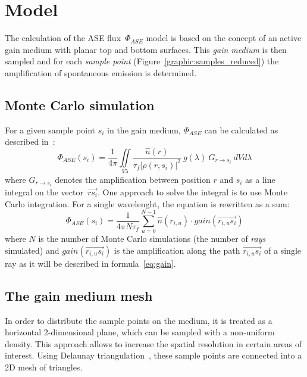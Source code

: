 \section{Model}
The calculation of the ASE flux~$\Phi_{ASE}$ model is based on the concept of an
active gain medium with planar top and bottom surfaces. This \emph{gain medium} is
then sampled and for each \emph{sample point} (Figure~\ref{graphic:samples_reduced}) the amplification of spontaneous emission is
determined. 

\subsection{Monte Carlo simulation}
\label{subsec:monteCarlo}
For a given sample point $s_i$ in the gain medium, $\Phi_{ASE}$ can
be calculated as described in~\cite{ASE2010}:
\begin{equation}
  \label{eq:phi_ase_daniel} 
  \Phi_{ASE}(s_i)=\frac{1}{4\pi}\iint\limits_{V \lambda}
  \frac
    {\hat{n}(r)}
    {\tau_{f}|\rho(r,s_i)|^2}
  ~g(\lambda)
  ~G_{r\rightarrow s_i}
  ~dV d\lambda
\end{equation}
where $G_{r\rightarrow s_i}$ denotes the amplification between
position $r$ and $s_i$ as a line integral on the vector~$\overrightarrow{rs_i}$.
One approach to solve the integral is to use Monte Carlo integration. For a
single wavelenght, the equation is rewritten as a sum:
\begin{equation}
  \label{eq:monte_carlo_ase}
  \Phi_{ASE}(s_i) = 
  \frac{1}{4\pi N\tau_f}
  \sum^{N-1}_{u=0} \hat{n}(r_{i,u}) \cdot gain(\overrightarrow{r_{i,u}s_i})
\end{equation}
where $N$ is the number of Monte Carlo simulations (the number of \emph{rays}
simulated) and $gain(\overrightarrow{r_{i,u}s_i})$ is the amplification along the
path $\overrightarrow{r_{i,u}s_i}$ of a single ray as it will be described in
formula~\eqref{eq:gain}. 


\subsection{The gain medium mesh} \label{subsec:meshSampling}
In order to distribute the sample points on the medium, it is treated as
a horizontal 2-dimensional plane, which can be sampled with a non-uniform
density. This approach allows to increase the spatial resolution in certain
areas of interest. Using Delaunay triangulation~\cite{delaunay_triangulation},
these sample points are connected into a 2D mesh of triangles.


